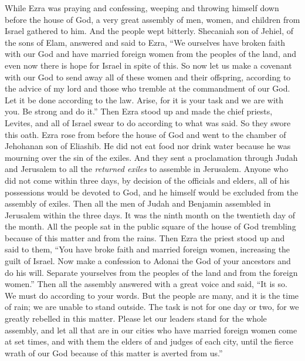
\begin{biblechapter} %
 While Ezra was praying and confessing, weeping and throwing himself down before the house of God, a very great assembly of men, women, and children from Israel gathered to him. And the people wept bitterly.
\verse Shecaniah son of Jehiel, of the sons of Elam, answered and said to Ezra, “We ourselves have broken faith with our God and have married foreign women from the peoples of the land, and even now there is hope for Israel in spite of this.
\verse So now let us make a covenant with our God to send away all of these women and their offspring, according to the advice of my lord and those who tremble at the commandment of our God. Let it be done according to the law.
\verse Arise, for it is your task and we are with you. Be strong and do it.”
\verse Then Ezra stood up and made the chief priests, Levites, and all of Israel swear to do according to what was said. So they swore this oath.
 Ezra rose from before the house of God and went to the chamber of Jehohanan son of Eliashib. He did not eat food nor drink water because he was mourning over the sin of the exiles.
\verse And they sent a proclamation through Judah and Jerusalem to all the \textit{returned exiles} to assemble in Jerusalem.
\verse Anyone who did not come within three days, by decision of the officials and elders, all of his possessions would be devoted to God, and he himself would be excluded from the assembly of exiles.
\verse Then all the men of Judah and Benjamin assembled in Jerusalem within the three days. It was the ninth month on the twentieth day of the month. All the people sat in the public square of the house of God trembling because of this matter and from the rains.
\verse Then Ezra the priest stood up and said to them, “You have broke faith and married foreign women, increasing the guilt of Israel.
\verse Now make a confession to Adonai the God of your ancestors and do his will. Separate yourselves from the peoples of the land and from the foreign women.”
\verse Then all the assembly answered with a great voice and said, “It is so. We must do according to your words.
\verse But the people are many, and it is the time of rain; we are unable to stand outside. The task is not for one day or two, for we greatly rebelled in this matter.
\verse Please let our leaders stand for the whole assembly, and let all that are in our cities who have married foreign women come at set times, and with them the elders of and judges of each city, until the fierce wrath of our God because of this matter is averted from us.”

\end{biblechapter}
